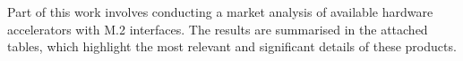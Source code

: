 


Part of this work involves conducting a market analysis of available hardware accelerators with M.2 interfaces. The results are summarised in the attached tables, which highlight the most relevant and significant details of these products.

